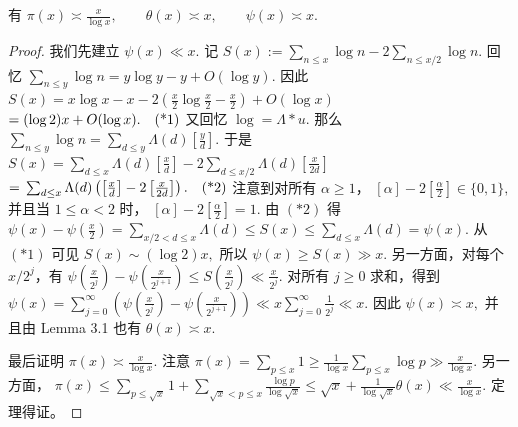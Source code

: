 \begin{theorem}[原文 Theorem 3.3]
	有
	\(\textstyle \pi(x)\asymp\allowbreak{} \frac{x}{\log x},\allowbreak{} \qquad \theta(x)\asymp\allowbreak{} x,\allowbreak{} \qquad \psi(x)\asymp\allowbreak{} x.\)
\end{theorem}

\begin{proof}
	我们先建立
	\(\textstyle \psi(x)\ll\allowbreak{} x.\)
	记
	\(\textstyle S(x):=\allowbreak{}\sum_{n\leq\allowbreak{} x}\log n-2\sum_{n\leq\allowbreak{} x/2}\log n.\)
	回忆
	\(\textstyle \sum_{n\leq\allowbreak{} y}\log n=\allowbreak{}y\log y-y+\allowbreak{}O(\log y).\)
	因此
	\(\textstyle S(x) =\allowbreak{} x\log x-x -2\left(\frac x2\log\frac x2-\frac x2\right) +\allowbreak{}O(\log x)\) \(\textstyle =\allowbreak{} (\log 2)x+\allowbreak{}O(\log x). \quad\textup{(*1)}\)
	又回忆
	\(\textstyle \log=\allowbreak{}\Lambda*u.\)
	那么
	\(\textstyle \sum_{n\leq\allowbreak{} y}\log n =\allowbreak{} \sum_{d\leq\allowbreak{} y}\Lambda(d)\left[\frac yd\right].\)
	于是
	\(\textstyle S(x) =\allowbreak{} \sum_{d\leq\allowbreak{} x}\Lambda(d)\left[\frac xd\right] - 2\sum_{d\leq\allowbreak{} x/2}\Lambda(d)\left[\frac{x}{2d}\right]\) \(\textstyle =\allowbreak{} \sum_{d\leq\allowbreak{} x}\Lambda(d) \left(\left[\frac xd\right]-2\left[\frac{x}{2d}\right]\right). \quad\textup{(*2)}\)
	注意到对所有 $\alpha\geq 1$，
	\(\textstyle [\alpha]-2\left[\frac\alpha2\right]\in\{0,\allowbreak{}1\},\allowbreak{}\)
	并且当 $1\leq \alpha<2$ 时，
	\(\textstyle [\alpha]-2\left[\frac\alpha2\right]=\allowbreak{}1.\)
	由 $(*2)$ 得
	\(\textstyle \psi(x)-\psi\left(\frac x2\right) =\allowbreak{} \sum_{x/2<d\leq\allowbreak{} x}\Lambda(d) \leq\allowbreak{} S(x) \leq\allowbreak{} \sum_{d\leq\allowbreak{} x}\Lambda(d)=\allowbreak{}\psi(x).\)
	从 $(*1)$ 可见
	\(\textstyle S(x)\sim\allowbreak{} (\log 2)x,\allowbreak{}\)
	所以
	\(\textstyle \psi(x)\geq\allowbreak{} S(x)\gg\allowbreak{} x.\)
	另一方面，对每个 $x/2^j$，有
	\(\textstyle \psi\left(\frac{x}{2^j}\right) - \psi\left(\frac{x}{2^{j+\allowbreak{}1}}\right) \leq\allowbreak{} S\left(\frac{x}{2^j}\right) \ll\allowbreak{} \frac{x}{2^j}.\)
	对所有 $j\geq 0$ 求和，得到
	\(\textstyle \psi(x) =\allowbreak{} \sum_{j=\allowbreak{}0}^\infty \left( \psi\left(\frac{x}{2^j}\right) - \psi\left(\frac{x}{2^{j+\allowbreak{}1}}\right) \right) \ll\allowbreak{} x\sum_{j=\allowbreak{}0}^\infty\frac1{2^j} \ll\allowbreak{} x.\)
	因此
	\(\textstyle \psi(x)\asymp\allowbreak{} x,\allowbreak{}\)
	并且由 Lemma 3.1 也有
	\(\textstyle \theta(x)\asymp\allowbreak{} x.\)

	最后证明
	\(\textstyle \pi(x)\asymp\allowbreak{} \frac{x}{\log x}.\)
	注意
	\(\textstyle \pi(x)=\allowbreak{}\sum_{p\leq\allowbreak{} x}1 \geq\allowbreak{} \frac1{\log x}\sum_{p\leq\allowbreak{} x}\log p \gg\allowbreak{} \frac{x}{\log x}.\)
	另一方面，
	\(\textstyle \pi(x) \leq\allowbreak{} \sum_{p\leq\allowbreak{} \sqrt{x}}1 +\allowbreak{} \sum_{\sqrt{x}<p\leq\allowbreak{} x}\frac{\log p}{\log\sqrt{x}} \leq\allowbreak{} \sqrt{x}+\allowbreak{}\frac1{\log\sqrt{x}}\theta(x) \ll\allowbreak{} \frac{x}{\log x}.\)
	定理得证。
\end{proof}

